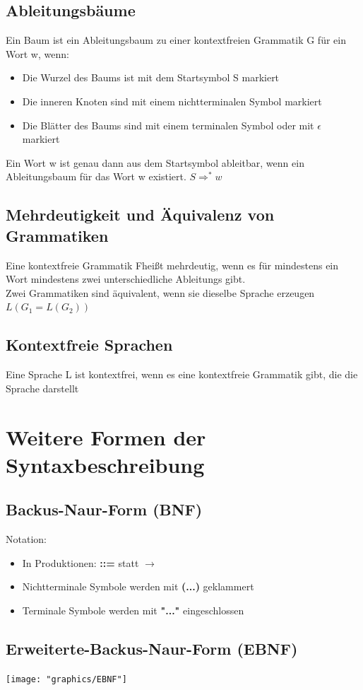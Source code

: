 \documentclass{scrreprt}
\begin{document}
\subsection{Ableitungsbäume}
Ein Baum ist ein Ableitungsbaum zu einer kontextfreien Grammatik G für ein Wort w, wenn:
\begin{itemize}
    \item Die Wurzel des Baums ist mit dem Startsymbol S markiert
    \item Die inneren Knoten sind mit einem nichtterminalen Symbol markiert
    \item Die Blätter des Baums sind mit einem terminalen Symbol oder mit $\epsilon$ markiert
\end{itemize}
Ein Wort w ist genau dann aus dem Startsymbol ableitbar, wenn ein Ableitungsbaum für das Wort w existiert. $S \Rightarrow ^{*} w$
\subsection{Mehrdeutigkeit und Äquivalenz von Grammatiken}
Eine kontextfreie Grammatik Fheißt mehrdeutig, wenn es für mindestens ein Wort mindestens zwei unterschiedliche Ableitungs gibt.
\\Zwei Grammatiken sind äquivalent, wenn sie dieselbe Sprache erzeugen $L(G_{1}=L(G_{2}))$
\subsection{Kontextfreie Sprachen}
Eine Sprache L ist kontextfrei, wenn es eine kontextfreie Grammatik gibt, die die Sprache darstellt
\section{Weitere Formen der Syntaxbeschreibung}
\subsection{Backus-Naur-Form (BNF)}
Notation:
\begin{itemize}
    \item In Produktionen: \textbf{::=} statt \textbf{$\rightarrow$}
    \item Nichtterminale Symbole werden mit \textbf{(...)} geklammert
    \item Terminale Symbole werden mit \textbf{"..."} eingeschlossen
\end{itemize}
\subsection{Erweiterte-Backus-Naur-Form (EBNF)}
\texttt{[image: "graphics/EBNF"]}
\end{document}
